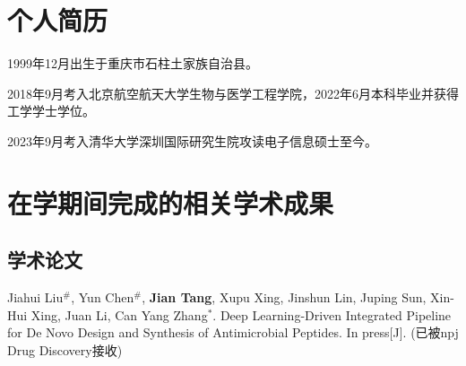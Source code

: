 
\begin{resume}

  \section*{个人简历}

  1999年12月出生于重庆市石柱土家族自治县。

  2018年9月考入北京航空航天大学生物与医学工程学院，2022年6月本科毕业并获得工学学士学位。

  2023年9月考入清华大学深圳国际研究生院攻读电子信息硕士至今。


  \section*{在学期间完成的相关学术成果}

  \subsection*{学术论文}

  \begin{achievements}
    \item Jiahui Liu$^{\#}$, Yun Chen$^{\#}$, \textbf{Jian Tang}, Xupu Xing, Jinshun Lin, Juping Sun, Xin-Hui Xing, Juan Li, Can Yang Zhang$^{*}$. Deep Learning-Driven Integrated Pipeline for De Novo Design and Synthesis of Antimicrobial Peptides. In press[J]. (已被npj Drug Discovery接收)
  \end{achievements}

\end{resume}




